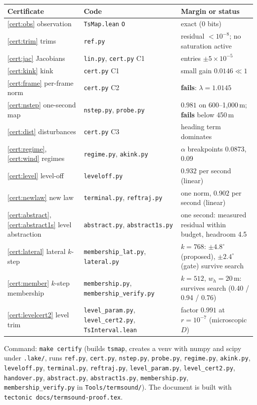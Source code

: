 \documentclass[11pt]{article}
\begin{document}
\begin{center}
\begin{tabular}{lll}
\toprule
Certificate & Code & Margin or status\\
\midrule
\ref{cert:obs} observation & \texttt{TsMap.lean} \texttt{O} & exact (0 bits)\\
\ref{cert:trim} trims & \texttt{ref.py} & residual $< 10^{-8}$; no saturation active\\
\ref{cert:jac} Jacobians & \texttt{lin.py}, \texttt{cert.py} C1 & entries $\pm 5\times10^{-5}$\\
\ref{cert:kink} kink & \texttt{cert.py} C1 & small gain $0.0146 \ll 1$\\
\ref{cert:frame} per-frame norm & \texttt{cert.py} C2 & \textbf{fails}: $\lambda = 1.0145$\\
\ref{cert:nstep} one-second map & \texttt{nstep.py}, \texttt{probe.py} & $0.981$ on 600--1{,}000\,m; \textbf{fails} below 450\,m\\
\ref{cert:dist} disturbances & \texttt{cert.py} C3 & heading term dominates\\
\ref{cert:regime}, \ref{cert:wind} regimes & \texttt{regime.py}, \texttt{akink.py} & $\alpha$ breakpoints 0.0873, 0.09\\
\ref{cert:level} level-off & \texttt{leveloff.py} & $0.932$ per second (linear)\\
\ref{cert:newlaw} new law & \texttt{terminal.py}, \texttt{reftraj.py} & one norm, $0.902$ per second (linear)\\
\ref{cert:abstract}, \ref{cert:abstract1s} level abstraction & \texttt{abstract.py}, \texttt{abstract1s.py} & one second: measured residual within budget, headroom 4.5\\
\ref{cert:lateral} lateral $k$-step & \texttt{membership\_lat.py}, \texttt{lateral.py} & $k = 768$: $\pm4.8^\circ$ (proposed), $\pm2.4^\circ$ (gate) survive search\\
\ref{cert:member} $k$-step membership & \texttt{membership.py}, \texttt{membership\_verify.py} & $k = 512$, $w_h = 20$\,m: survives search (0.40 / 0.94 / 0.76)\\
\ref{cert:levelcert2} level trim & \texttt{level\_param.py}, \texttt{level\_cert2.py}, \texttt{TsInterval.lean} & factor $0.991$ at $r = 10^{-7}$ (microscopic $D$)\\
\bottomrule
\end{tabular}
\end{center}
Command: \texttt{make certify} (builds \texttt{tsmap}, creates a venv with numpy and scipy under \texttt{.lake/}, runs \texttt{ref.py}, \texttt{cert.py}, \texttt{nstep.py}, \texttt{probe.py}, \texttt{regime.py}, \texttt{akink.py}, \texttt{leveloff.py}, \texttt{terminal.py}, \texttt{reftraj.py}, \texttt{level\_param.py}, \texttt{level\_cert2.py}, \texttt{handover.py}, \texttt{abstract.py}, \texttt{abstract1s.py}, \texttt{membership.py}, \texttt{membership\_verify.py} in \texttt{Tools/termsound/}). The document is built with \texttt{tectonic docs/termsound-proof.tex}.
\end{document}

